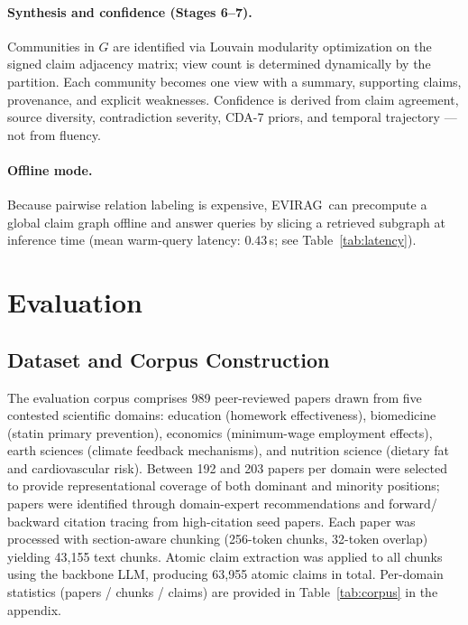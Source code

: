 \documentclass[11pt]{article}
\newcommand{\system}{\textsc{EVIRAG}\xspace}
\begin{document}
\paragraph{Synthesis and confidence (Stages 6--7).}
Communities in $G$ are identified via Louvain modularity optimization on the
signed claim adjacency matrix; view count is determined dynamically by the
partition.  Each community becomes one view with a summary, supporting claims,
provenance, and explicit weaknesses.  Confidence is derived from claim
agreement, source diversity, contradiction severity, CDA-7 priors, and
temporal trajectory --- not from fluency.

\paragraph{Offline mode.}
Because pairwise relation labeling is expensive, \system\ can precompute a
global claim graph offline and answer queries by slicing a retrieved subgraph
at inference time (mean warm-query latency: $0.43$\,s; see
Table~\ref{tab:latency}).

\section{Evaluation}
\label{sec:eval}

\subsection{Dataset and Corpus Construction}
\label{sec:corpus}

The evaluation corpus comprises 989 peer-reviewed papers drawn from five
contested scientific domains: education (homework effectiveness), biomedicine
(statin primary prevention), economics (minimum-wage employment effects),
earth sciences (climate feedback mechanisms), and nutrition science (dietary
fat and cardiovascular risk).  Between 192 and 203 papers per domain were selected to
provide representational coverage of both dominant and minority positions;
papers were identified through domain-expert recommendations and forward/
backward citation tracing from high-citation seed papers.  Each paper was
processed with section-aware chunking (256-token chunks, 32-token overlap)
yielding 43,155 text chunks.  Atomic claim extraction was applied to all
chunks using the backbone LLM, producing 63,955 atomic claims in total.
Per-domain statistics (papers / chunks / claims) are provided in
Table~\ref{tab:corpus} in the appendix.
\end{document}
